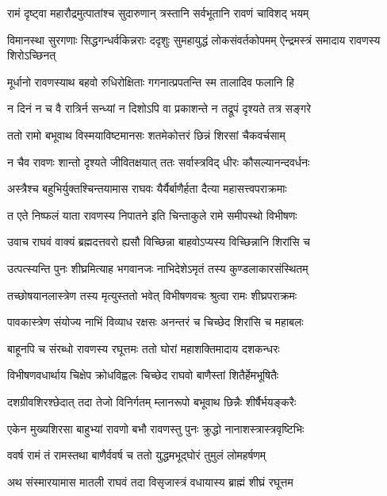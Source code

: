 \twolineshloka
{रामं दृष्ट्वा महारौद्रमुत्पातांश्च सुदारुणान्}
{त्रस्तानि सर्वभूतानि रावणं चाविशद् भयम्} %

\threelineshloka
{विमानस्था सुरगणाः सिद्धगन्धर्वकिन्नराः}
{ददृशुः सुमहायुद्धं लोकसंवर्तकोपमम्}
{ऐन्द्रमस्त्रं समादाय रावणस्य शिरोऽच्छिनत्} %

\twolineshloka
{मूर्धानो रावणस्याथ बहवो रुधिरोक्षिताः}
{गगनात्प्रपतन्ति स्म तालादिव फलानि हि} %

\twolineshloka
{न दिनं न च वै रात्रिर्न सन्ध्यां न दिशोऽपि वा}
{प्रकाशन्ते न तद्रूपं दृश्यते तत्र सङ्गरे} %

\twolineshloka
{ततो रामो बभूवाथ विस्मयाविष्टमानसः}
{शतमेकोत्तरं छिन्नं शिरसां चैकवर्चसाम्} %

\twolineshloka
{न चैव रावणः शान्तो दृश्यते जीवितक्षयात्}
{ततः सर्वास्त्रविद् धीरः कौसल्यानन्दवर्धनः} %

\twolineshloka
{अस्त्रैश्च बहुभिर्युक्तश्चिन्तयामास राघवः}
{यैर्यैर्बाणैर्हता दैत्या महासत्त्वपराक्रमाः} %

\twolineshloka
{त एते निष्फलं याता रावणस्य निपातने}
{इति चिन्ताकुले रामे समीपस्थो विभीषणः} %

\twolineshloka
{उवाच राघवं वाक्यं ब्रह्मदत्तवरो ह्यसौ}
{विच्छिन्ना बाहवोऽप्यस्य विच्छिन्नानि शिरांसि च} %

\twolineshloka
{उत्पत्स्यन्ति पुनः शीघ्रमित्याह भगवानजः}
{नाभिदेशेऽमृतं तस्य कुण्डलाकारसंस्थितम्} %

\twolineshloka
{तच्छोषयानलास्त्रेण तस्य मृत्युस्ततो भवेत्}
{विभीषणवचः श्रुत्वा रामः शीघ्रपराक्रमः} %

\twolineshloka
{पावकास्त्रेण संयोज्य नाभिं विव्याध रक्षसः}
{अनन्तरं च चिच्छेद शिरांसि च महाबलः} %

\twolineshloka
{बाहूनपि च संरब्धो रावणस्य रघूत्तमः}
{ततो घोरां महाशक्तिमादाय दशकन्धरः} %

\twolineshloka
{विभीषणवधार्थाय चिक्षेप क्रोधविह्वलः}
{चिच्छेद राघवो बाणैस्तां शितैर्हेमभूषितैः} %

\twolineshloka
{दशग्रीवशिरश्छेदात् तदा तेजो विनिर्गतम्}
{म्लानरूपो बभूवाथ छिन्नैः शीर्षैर्भयङ्करैः} %

\twolineshloka
{एकेन मुख्यशिरसा बाहुभ्यां रावणो बभौ}
{रावणस्तु पुनः क्रुद्धो नानाशस्त्रास्त्रवृष्टिभिः} %

\twolineshloka
{ववर्ष रामं तं रामस्तथा बाणैर्ववर्ष च}
{ततो युद्धमभूद्\mbox{}घोरं तुमुलं लोमहर्षणम्} %

\twolineshloka
{अथ संस्मारयामास मातली राघवं तदा}
{विसृजास्त्रं वधायास्य ब्राह्मं शीघ्रं रघूत्तम} %

